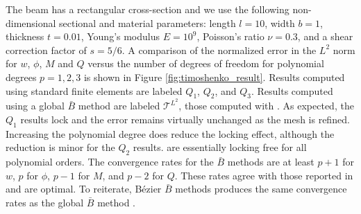 \documentclass{article}
\begin{document}
The beam has a rectangular cross-section and we use the following non-dimensional sectional and material parameters: length $l=10$, width $b=1$, thickness $t=0.01$, Young's modulus $E=10^9$, Poisson's ratio $\nu=0.3$, and a shear correction factor of $s=5/6$. A comparison of the normalized error in the $L^2$ norm for $w$, $\phi$, $M$ and $Q$ versus the number of degrees of freedom for polynomial degrees $p=1,2,3$ is shown in Figure \ref{fig:timoshenko_result}. Results computed using standard finite elements are labeled $Q_1$, $Q_2$, and $Q_3$. Results computed using a global $\bar{B}$ method are labeled $\mathcal{T}^{L^2}$, those computed with . As expected, the $Q_1$ results lock and the error remains virtually unchanged as the mesh is refined. Increasing the polynomial degree does reduce the locking effect, although the reduction is minor for the $Q_2$ results.  are essentially locking free for all polynomial orders. The convergence rates for the $\bar{B}$ methods are at least $p+1$ for $w$, $p$ for $\phi$, $p-1$ for $M$, and $p-2$ for $Q$. These rates agree with those reported in \cite{kiendl_single-variable_2015} and are optimal. To reiterate, B\'{e}zier $\bar{B}$ methods produces the same convergence rates as the global $\bar{B}$ method .
\end{document}
